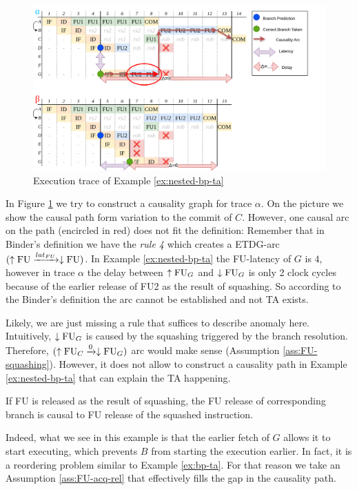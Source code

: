 \begin{figure}[H]
    \centering
    \includegraphics[width=\textwidth]{figures/nested-bp-ta.png}
    \caption{Execution trace of Example \ref{ex:nested-bp-ta}}
    \label{fig:nested-bp-ta-trace}
\end{figure}


In Figure \ref{fig:nested-bp-ta-trace} we try to construct a causality graph for trace $\alpha$. On the picture we show the causal path form variation to the commit of $C$. However, one causal arc on the path (encircled in red) does not fit the definition: Remember that in Binder's definition we have the \textit{rule 4} which creates a ETDG-arc $(\uparrow\mathrm{FU} \xrightarrow{lat_{FU}} \downarrow\mathrm{FU})$. In Example \ref{ex:nested-bp-ta} the FU-latency of $G$ is $4$, however in trace $\alpha$ the delay between $\uparrow\mathrm{FU}_G$ and $\downarrow\mathrm{FU}_G$ is only 2 clock cycles because of the earlier release of FU2 as the result of squashing. So according to the Binder's definition the arc cannot be established and not TA exists.

Likely, we are just missing a rule that suffices to describe anomaly here. Intuitively, $\downarrow\mathrm{FU}_G$ is caused by the squashing triggered by the branch resolution. Therefore, $(\uparrow\mathrm{FU}_C \xrightarrow{0} \downarrow\mathrm{FU}_G)$ arc would make sense (Assumption \ref{ass:FU-squashing}). However, it does not allow to construct a causality path in Example \ref{ex:nested-bp-ta} that can explain the TA happening. 

\begin{assumption}
If FU is released as the result of squashing, the FU release of corresponding branch is causal to FU release of the squashed instruction.
\label{ass:FU-squashing}
\end{assumption}

Indeed, what we see in this example is that the earlier fetch of $G$ allows it to start executing, which prevents $B$ from starting the execution earlier. In fact, it is a reordering problem similar to Example \ref{ex:bp-ta}. For that reason we take an Assumption \ref{ass:FU-acq-rel} that effectively fills the gap in the causality path.

